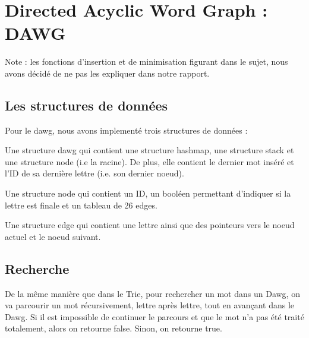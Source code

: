 \chapter{Directed Acyclic Word Graph : DAWG}

Note : les fonctions d'insertion et de minimisation figurant dans le sujet, nous avons décidé de ne pas les expliquer dans notre rapport.

\section{Les structures de données}

Pour le dawg, nous avons implementé trois structures de données :

Une structure dawg qui contient une structure hashmap, une structure stack et une structure node (i.e la racine). De plus, elle contient le dernier mot inséré et l'ID de sa dernière lettre (i.e. son dernier noeud). 

Une structure node qui contient un ID, un booléen permettant d'indiquer si la lettre est finale et un tableau de 26 edges.

Une structure edge qui contient une lettre ainsi que des pointeurs vers le noeud actuel et le noeud suivant.

\section{Recherche}

De la même manière que dans le Trie, pour rechercher un mot dans un Dawg, on va parcourir un mot récursivement, lettre après lettre, tout en avançant dans le Dawg. Si il est impossible de continuer le parcours et que le mot n’a pas été traité totalement, alors on retourne false. Sinon, on retourne true.

